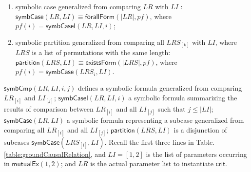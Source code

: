 \documentclass[conference]{IEEEtran}
\def \iInv {iInv}
\def \iR {iR}
\begin{document}
{\begin{definition}
\begin{enumerate}
\item symbolic case  generalized from comparing $LR$ with $LI$ : $\mathsf{symbCase}(LR,LI )\equiv \mathsf{forallForm}(|LR|,pf)$, where $pf(i)= \mathsf{symbCaseI}(LR,LI,i )$;

\item symbolic partition generalized from comparing all $LRS_{[k]}$ with $LI$, where $LRS$ is a list of permutations with the same length: $\mathsf{partition}(LRS,LI) \equiv \mathsf{existsForm}(|LRS|,pf)$,  where $pf(i)= \mathsf{symbCase}(LRS_i,LI)$.

\end{enumerate}
\end{definition}

$\mathsf{symbCmp}(LR,LI,i,j)$ defines a symbolic formula  generalized from comparing $LR_{[i]}$ and $LI_{[j]}$; $\mathsf{symbCaseI}(LR,LI,i)$  a symbolic formula summarizing the results of comparison  between $LR_{[i]}$  and all $LI_{[j]}$ such that $j \le |LI|$; $\mathsf{symbCase}(LR,LI )$ a symbolic formula representing a subcase generalized from comparing all $LR_{[i]}$  and all $LI_{[j]}$; $\mathsf{partition}(LRS,LI)$  is a disjunction of subcases $\mathsf{symbCase}(LRS_{[i]},LI )$.  Recall the first three lines in Table. \ref{table:groundCausalRelation}, and $LI=[1,2]$ is the list of parameters occurring in $\mathsf{mutualEx}(1,2)$; and $LR$ is the actual parameter list to instantiate $\mathsf{crit}$.


\begin{itemize}


\end{itemize}}
\end{document}
